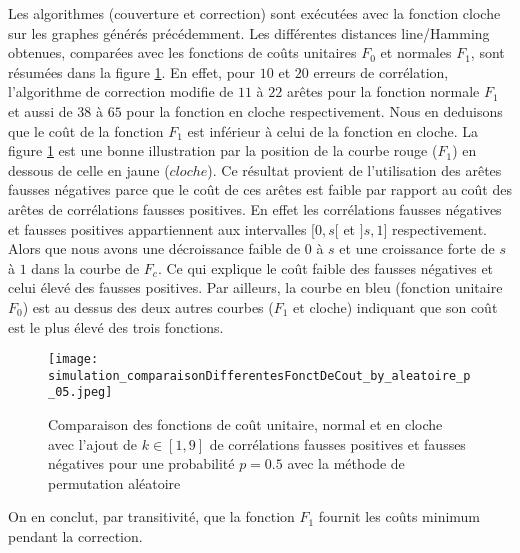Les algorithmes (couverture et correction) sont ex\'ecut\'ees avec la fonction cloche sur les graphes g\'en\'er\'es pr\'ec\'edemment. 
Les diff\'erentes distances line/Hamming obtenues, compar\'ees avec les fonctions de co\^uts unitaires $F_0$ et normales $F_1$, sont r\'esum\'ees dans la figure \ref{comparaison_fct_cloche_unitaire_normal_p05}.
En effet, pour $10$ et $20$ erreurs de corr\'elation, l'algorithme de correction modifie  de $11$ \`a $22$ ar\^etes pour la fonction normale $F_1$ et aussi de $38$ \`a $65$ pour la fonction en cloche respectivement. 
Nous en deduisons que le co\^ut de la fonction $F_1$ est  inf\'erieur \`a celui de la fonction en cloche. 
La figure \ref{comparaison_fct_cloche_unitaire_normal_p05}  est une bonne illustration par la position de la courbe rouge ($F_1$) en dessous de celle en jaune ($cloche$).
\newline
Ce r\'esultat provient de l'utilisation des ar\^etes fausses n\'egatives parce que le co\^ut de ces ar\^etes est faible par rapport au co\^ut des ar\^etes de corr\'elations fausses positives.
En effet les corr\'elations fausses n\'egatives et fausses positives appartiennent aux intervalles $[0,s[$ et $]s,1]$ respectivement. 
Alors que nous avons une d\'ecroissance faible de $0$ \`a $s$ et une croissance forte de $s$ \`a $1$ dans la courbe de $F_c$. 
Ce qui explique le co\^ut faible des fausses n\'egatives et celui \'elev\'e des fausses positives. 
Par ailleurs, la courbe en bleu (fonction unitaire $F_0$) est au dessus des deux autres courbes ($F_1$ et cloche) indiquant que son co\^ut est le plus \'elev\'e des trois fonctions.
\newline
\begin{figure}[htb!] 
\centering
\texttt{[image: simulation\_comparaisonDifferentesFonctDeCout\_by\_aleatoire\_p\_05.jpeg]}
\caption{ Comparaison des fonctions de co\^ut unitaire, normal et en cloche avec l'ajout de $k \in [1,9]$ de corr\'elations fausses positives et fausses n\'egatives pour une probabilit\'e $p = 0.5$ avec la m\'ethode de permutation al\'eatoire }
\label{comparaison_fct_cloche_unitaire_normal_p05} 
\end{figure}
On en conclut, par transitivit\'e, que la fonction $F_1$ fournit les co\^uts minimum pendant la correction.


